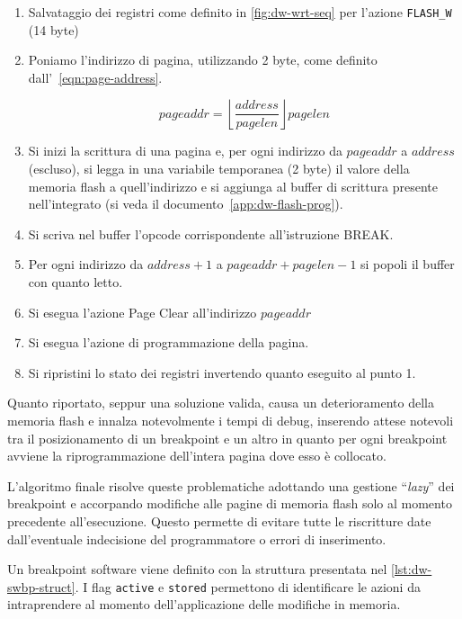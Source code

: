 \begin{enumerate}
    \item Salvataggio dei registri come definito in \cref{fig:dw-wrt-seq} per l'azione \texttt{FLASH\_W} (14 byte)
    \item Poniamo l'indirizzo di pagina, utilizzando 2 byte, come definito dall'~\cref{eqn:page-address}.
    
    \begin{equation}\label{eqn:page-address}
    pageaddr = \left\lfloor\frac{address}{pagelen}\right\rfloor pagelen
    \end{equation}

    \item Si inizi la scrittura di una pagina e, per ogni indirizzo da \(pageaddr\) a \(address\) (escluso), si legga in una variabile temporanea (2 byte) il valore della memoria flash a quell'indirizzo e si aggiunga al buffer di scrittura presente nell'integrato (si veda il documento~\ref{app:dw-flash-prog}).
    \item Si scriva nel buffer l'opcode corrispondente all'istruzione BREAK.\@ 
    \item Per ogni indirizzo da \(address + 1\) a \(pageaddr + pagelen - 1\) si popoli il buffer con quanto letto. 
    \item Si esegua l'azione Page Clear all'indirizzo \(pageaddr\)
    \item Si esegua l'azione di programmazione della pagina.
    \item Si ripristini lo stato dei registri invertendo quanto eseguito al punto 1.
\end{enumerate}

Quanto riportato, seppur una soluzione valida, causa un deterioramento della memoria flash e innalza notevolmente i tempi di debug, inserendo attese notevoli tra il posizionamento di un breakpoint e un altro in quanto per ogni breakpoint avviene la riprogrammazione dell'intera pagina dove esso è collocato.

L'algoritmo finale risolve queste problematiche adottando una gestione ``\textit{lazy}'' dei breakpoint e accorpando modifiche alle pagine di memoria flash solo al momento precedente all'esecuzione.
Questo permette di evitare tutte le riscritture date dall'eventuale indecisione del programmatore o errori di inserimento.

Un breakpoint software viene definito con la struttura presentata nel \cref{lst:dw-swbp-struct}. I flag \texttt{active} e \texttt{stored} permettono di identificare le azioni da intraprendere al momento dell'applicazione delle modifiche in memoria.

